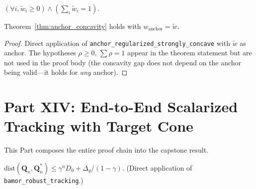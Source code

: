 \begin{theorem}
$(\forall i, \tilde{w}_i \ge 0) \wedge (\sum_i \tilde{w}_i = 1)$.
\end{theorem}

\begin{theorem}
Theorem~\ref{thm:anchor_concavity} holds with $w_{\mathrm{anchor}} = \tilde{w}$.
\end{theorem}
\begin{proof}
Direct application of \texttt{anchor\_regularized\_strongly\_concave} with $\tilde{w}$ as anchor.  The hypotheses $\rho \ge 0$, $\sum \rho = 1$ appear in the theorem statement but are not used in the proof body (the concavity gap does not depend on the anchor being valid---it holds for \emph{any} anchor).
\end{proof}


\section{Part XIV: End-to-End Scalarized Tracking with Target Cone}
\label{app:capstone}

This Part composes the entire proof chain into the capstone result.

\begin{lemma}
$\mathrm{dist}(\mathbf{Q}_n, \mathbf{Q}^*_n) \le \gamma^n D_0 + \Delta_g/(1{-}\gamma)$.  (Direct application of \texttt{bamor\_robust\_tracking}.)
\end{lemma}

